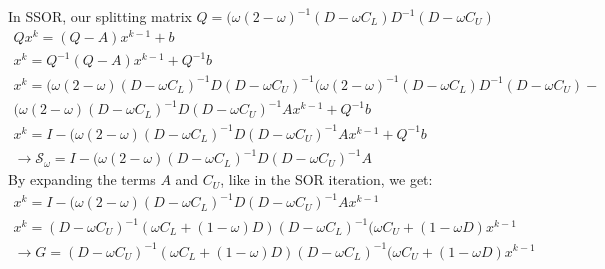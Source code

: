 In SSOR, our splitting matrix $Q = (\omega (2 - \omega)^{-1} (D-\omega C_L)D^{-1}(D-\omega C_U)$
\begin{gather*}
Qx^k = (Q-A) x^{k-1} + b \\
x^{k} = Q^{-1}(Q-A) x^{k-1} + Q^{-1}b\\
x^k = (\omega (2 - \omega) (D-\omega C_L)^{-1} D(D-\omega C_U)^{-1} (\omega (2 - \omega)^{-1} (D-\omega C_L)D^{-1}(D-\omega C_U)-\\ (\omega (2 - \omega) (D-\omega C_L)^{-1} D(D-\omega C_U)^{-1} A x^{k-1} + Q^{-1}b \\
x^k = I - (\omega (2 - \omega) (D-\omega C_L)^{-1} D(D-\omega C_U)^{-1} A x^{k-1} + Q^{-1} b \\
\rightarrow \mathcal{S_{\omega}} =  I - (\omega (2 - \omega) (D-\omega C_L)^{-1} D(D-\omega C_U)^{-1} A
\end{gather*}
By expanding the terms $A$ and $C_U$, like in the SOR iteration, we get:
\begin{gather*}
x^k =  I - (\omega (2 - \omega) (D-\omega C_L)^{-1} D(D-\omega C_U)^{-1} A x^{k-1}\\
x^k = (D-\omega C_U)^{-1} (\omega C_L + ( 1- \omega)D ) (D-\omega C_L)^{-1}(\omega C_U + (1-\omega D) x^{k-1} \\
\rightarrow G = (D-\omega C_U)^{-1} (\omega C_L + ( 1- \omega)D ) (D-\omega C_L)^{-1}(\omega C_U + (1-\omega D) x^{k-1} 
\end{gather*}


